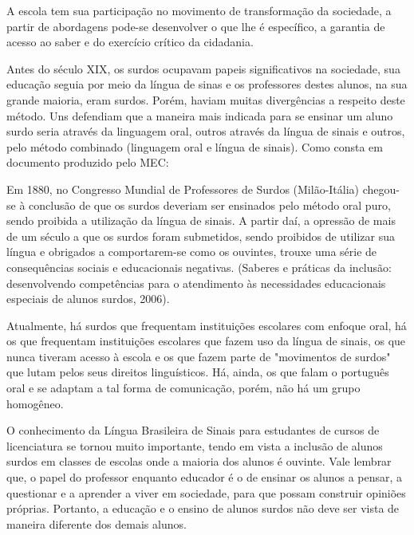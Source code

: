 \documentclass[brasil]{abnt}
\begin{document}
	A escola tem sua participação no movimento de transformação da sociedade, a partir de abordagens pode-se desenvolver o que lhe é específico, a garantia de acesso 
	ao saber e do exercício crítico da cidadania. 
	
	Antes do século XIX, os surdos ocupavam papeis significativos na sociedade, sua educação seguia por meio da língua de sinas e os professores destes alunos, na sua grande maioria, eram surdos. Porém, 
	haviam muitas divergências a respeito deste método. Uns defendiam que a maneira mais indicada para se ensinar um aluno surdo seria através da linguagem oral, outros através da língua de sinais e outros, 
	pelo método combinado (linguagem oral e língua de sinais). Como consta em documento produzido pelo MEC:
		
		\begin{citacao} Em 1880, no Congresso Mundial de Professores de Surdos (Milão-Itália) 
						chegou-se à conclusão de que os surdos deveriam ser ensinados pelo método oral puro, sendo proibida a utilização da língua de sinais. A partir daí, a opressão de mais de 
						um século a que os surdos foram submetidos, sendo proibidos de utilizar sua língua e obrigados a comportarem-se como os ouvintes, trouxe uma série de consequências sociais 
						e educacionais negativas. (Saberes e práticas da inclusão: desenvolvendo competências para o atendimento às necessidades educacionais especiais de alunos surdos, 2006).
		\end{citacao}

	Atualmente, há surdos que frequentam instituições escolares com enfoque oral, há os que frequentam instituições escolares que fazem uso da língua de sinais, os que nunca tiveram acesso à escola e os 
	que fazem parte de "movimentos de surdos" que lutam pelos seus direitos linguísticos. Há, ainda, os que falam o português oral e se adaptam a tal forma de comunicação, porém, não há um grupo homogêneo. 	
	
	O conhecimento da Língua Brasileira de Sinais para estudantes de cursos de licenciatura se tornou muito importante, tendo em vista a inclusão de alunos surdos em classes de escolas onde a maioria dos alunos é ouvinte. 
	Vale lembrar que, o papel do professor enquanto educador é o de ensinar os alunos a pensar, a questionar e a aprender a viver em sociedade, para que possam construir opiniões próprias. Portanto, a educação e o ensino de
	alunos surdos não deve ser vista de maneira diferente dos demais alunos.
	
\end{document}
